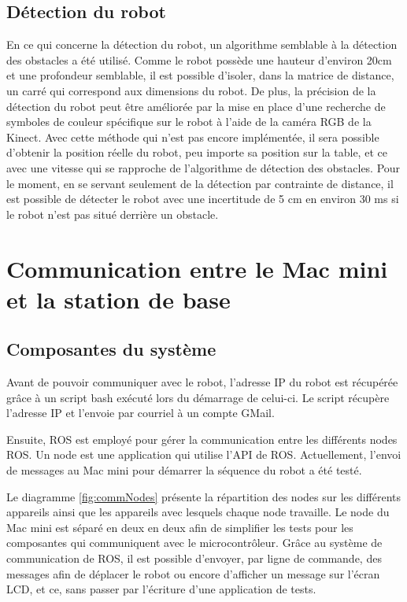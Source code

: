 \subsection{Détection du robot}
En ce qui concerne la détection du robot, un algorithme semblable à la détection des obstacles a été utilisé. Comme le robot possède une hauteur d'environ 20cm et une profondeur semblable, il est possible d'isoler, dans la matrice de distance, un carré qui correspond aux dimensions du robot. De plus, la précision de la détection du robot peut être améliorée par la mise en place d'une recherche de symboles de couleur spécifique sur le robot à l'aide de la caméra RGB de la Kinect. Avec cette méthode qui n'est pas encore implémentée, il sera possible d'obtenir la position réelle du robot, peu importe sa position sur la table, et ce avec une vitesse qui se rapproche de l'algorithme de détection des obstacles. Pour le moment, en se servant seulement de la détection par contrainte de distance, il est possible de détecter le robot avec une incertitude de 5 cm en environ 30 ms si le robot n'est pas situé derrière un obstacle.

\section{Communication entre le Mac mini et la station de base}
\subsection{Composantes du système}
Avant de pouvoir communiquer avec le robot, l’adresse IP du robot est récupérée grâce à un script bash exécuté lors du démarrage de celui-ci. Le script récupère l’adresse IP et l’envoie par courriel à un compte GMail.

Ensuite, ROS est employé pour gérer la communication entre les différents nodes ROS. Un node est une application qui utilise l’API de ROS. Actuellement, l’envoi de messages au Mac mini pour démarrer la séquence du robot a été testé.

Le diagramme \ref{fig:commNodes} présente la répartition des nodes sur les différents appareils ainsi que les appareils avec lesquels chaque node travaille. Le node du Mac mini est séparé en deux en deux afin de simplifier les tests pour les composantes qui communiquent avec le microcontrôleur. Grâce au système de communication de ROS, il est possible d'envoyer, par ligne de commande, des messages afin de déplacer le robot ou encore d'afficher un message sur l’écran LCD, et ce, sans passer par l’écriture d’une application de tests.

